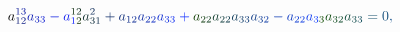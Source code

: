 \documentclass[12pt]{article}
\begin{document}
\begin{displaymath}
{a} _ { \mathcolor[RGB]{15,30,120}{1} \mathcolor[RGB]{15,30,135}{2} } ^ { \mathcolor[RGB]{15,30,150}{1} \mathcolor[RGB]{15,30,165}{3} } \mathcolor[RGB]{15,30,180}{a} _ { \mathcolor[RGB]{15,30,195}{3} \mathcolor[RGB]{15,30,210}{3} } \mathcolor[RGB]{15,30,225}{-} \mathcolor[RGB]{15,30,240}{a} _ { \mathcolor[RGB]{15,30,255}{1} \mathcolor[RGB]{15,45,0}{2} } ^ { \mathcolor[RGB]{15,45,15}{1} \mathcolor[RGB]{15,45,30}{2} } \mathcolor[RGB]{15,45,45}{a} _ { \mathcolor[RGB]{15,45,60}{3} \mathcolor[RGB]{15,45,75}{1} } ^ { \mathcolor[RGB]{15,45,90}{2} } \mathcolor[RGB]{15,45,105}{+} \mathcolor[RGB]{15,45,120}{a} _ { \mathcolor[RGB]{15,45,135}{1} \mathcolor[RGB]{15,45,150}{2} } \mathcolor[RGB]{15,45,165}{a} _ { \mathcolor[RGB]{15,45,180}{2} \mathcolor[RGB]{15,45,195}{2} } \mathcolor[RGB]{15,45,210}{a} _ { \mathcolor[RGB]{15,45,225}{3} \mathcolor[RGB]{15,45,240}{3} } \mathcolor[RGB]{15,45,255}{+} \mathcolor[RGB]{15,60,0}{a} _ { \mathcolor[RGB]{15,60,15}{2} \mathcolor[RGB]{15,60,30}{2} } \mathcolor[RGB]{15,60,45}{a} _ { \mathcolor[RGB]{15,60,60}{2} \mathcolor[RGB]{15,60,75}{2} } \mathcolor[RGB]{15,60,90}{a} _ { \mathcolor[RGB]{15,60,105}{3} \mathcolor[RGB]{15,60,120}{3} } \mathcolor[RGB]{15,60,135}{a} _ { \mathcolor[RGB]{15,60,150}{3} \mathcolor[RGB]{15,60,165}{2} } \mathcolor[RGB]{15,60,180}{-} \mathcolor[RGB]{15,60,195}{a} _ { \mathcolor[RGB]{15,60,210}{2} \mathcolor[RGB]{15,60,225}{2} } \mathcolor[RGB]{15,60,240}{a} _ { \mathcolor[RGB]{15,60,255}{3} \mathcolor[RGB]{15,75,0}{3} } \mathcolor[RGB]{15,75,15}{a} _ { \mathcolor[RGB]{15,75,30}{3} \mathcolor[RGB]{15,75,45}{2} } \mathcolor[RGB]{15,75,60}{a} _ { \mathcolor[RGB]{15,75,75}{3} \mathcolor[RGB]{15,75,90}{3} } \mathcolor[RGB]{15,75,105}{=} \mathcolor[RGB]{15,75,120}{0} \mathcolor[RGB]{15,75,135}{,} \mathcolor[RGB]{15,75,150}{\,

}
\end{displaymath}
\end{document}
